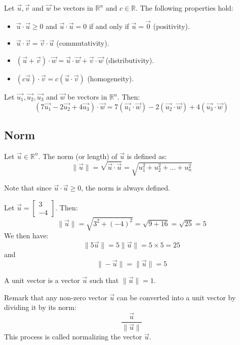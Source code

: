 \begin{theorem}
    Let $\vec{u}, \vec{v}$ and $\vec{w}$ be vectors in $\mathbb{R}^n$ and $c \in \mathbb{R}$. The following properties hold:
    \begin{itemize}[itemsep=1pt,label=$\circ$]
        \item $\vec{u} \cdot \vec{u} \geq 0$ and $\vec{u} \cdot \vec{u} = 0$ if and only if $\vec{u} = \vec{0}$ (positivity).
        \item $\vec{u} \cdot \vec{v} = \vec{v} \cdot \vec{u}$ (commutativity).
        \item $(\vec{u} + \vec{v}) \cdot \vec{w} = \vec{u} \cdot \vec{w} + \vec{v} \cdot \vec{w}$ (distributivity).
        \item $(c \vec{u}) \cdot \vec{v} = c (\vec{u} \cdot \vec{v})$ (homogeneity).
    \end{itemize}
\end{theorem}

\begin{eg}
    Let $\vec{u_1}, \vec{u_2}, \vec{u_3}$ and $\vec{w}$ be vectors in $\mathbb{R}^n$. Then:
    \[
        (7\vec{u_1} - 2 \vec{u_2} + 4\vec{u_3}) \cdot \vec{w} = 7(\vec{u_1} \cdot \vec{w}) - 2(\vec{u_2} \cdot \vec{w}) + 4(\vec{u_3} \cdot \vec{w})
    \]
\end{eg}

\subsection{Norm}
\begin{definition}[Norm]
    Let $\vec{u} \in \mathbb{R}^n$. The norm (or length) of $\vec{u}$ is defined as:
    \[
        \|\vec{u}\| = \sqrt{\vec{u} \cdot \vec{u}} = \sqrt{u_1^2 + u_2^2 + \ldots + u_n^2}
    \]
\end{definition}
Note that since $\vec{u} \cdot \vec{u} \geq 0$, the norm is always defined.

\begin{eg}
    Let $\vec{u} = \begin{bmatrix}
        3 \\ -4
    \end{bmatrix}$. Then:
    \[
        \|\vec{u}\| = \sqrt{3^2 + (-4)^2} = \sqrt{9 + 16} = \sqrt{25} = 5
    \]
    We then have:
    \[
        \|5 \vec{u}\| = 5 \|\vec{u}\| = 5 \times 5 = 25
    \]
    and \[
        \|-\vec{u}\| = \| \vec{u} \| = 5
    \]
\end{eg}

\begin{definition}
    A unit vector is a vector $\vec{u}$ such that $\|\vec{u}\| = 1$.
\end{definition}
Remark that any non-zero vector $\vec{u}$ can be converted into a unit vector by dividing it by its norm:
\[
    \frac{\vec{u}}{\|\vec{u}\|}
\]
This process is called normalizing the vector $\vec{u}$.


